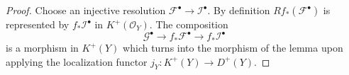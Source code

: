 \documentclass[10pt,a4paper]{amsart}
\theoremstyle{plain}
\theoremstyle{definition}
\theoremstyle{remark}
\numberwithin{equation}{subsection}
\begin{document}
\begin{proof}
Choose an injective resolution $\mathcal{F}^\bullet \to \mathcal{I}^\bullet$.
By definition $Rf_*(\mathcal{F}^\bullet)$ is represented by
$f_*\mathcal{I}^\bullet$ in $K^{+}(\mathcal{O}_Y)$.
The composition
$$
\mathcal{G}^\bullet \to f_*\mathcal{F}^\bullet \to f_*\mathcal{I}^\bullet
$$
is a morphism in $K^{+}(Y)$ which turns
into the morphism of the lemma upon applying the
localization functor $j_Y : K^{+}(Y) \to D^{+}(Y)$.
\end{proof}
\end{document}

